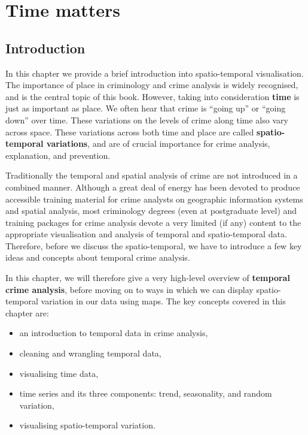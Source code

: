 \documentclass[
]{book}
\providecommand{\tightlist}{%
  \setlength{\itemsep}{0pt}\setlength{\parskip}{0pt}}
\begin{document}
\hypertarget{time-matters}{%
\chapter{Time matters}\label{time-matters}}

\hypertarget{introduction-5}{%
\section{Introduction}\label{introduction-5}}

In this chapter we provide a brief introduction into spatio-temporal visualisation. The importance of place in criminology and crime analysis is widely recognised, and is the central topic of this book. However, taking into consideration \textbf{time} is just as important as place. We often hear that crime is ``going up'' or ``going down'' over time. These variations on the levels of crime along time also vary across space. These variations across both time and place are called \textbf{spatio-temporal variations}, and are of crucial importance for crime analysis, explanation, and prevention.

Traditionally the temporal and spatial analysis of crime are not introduced in a combined manner. Although a great deal of energy has been devoted to produce accessible training material for crime analysts on geographic information systems and spatial analysis, most criminology degrees (even at postgraduate level) and training packages for crime analysis devote a very limited (if any) content to the appropriate visualisation and analysis of temporal and spatio-temporal data. Therefore, before we discuss the spatio-temporal, we have to introduce a few key ideas and concepts about temporal crime analysis.

In this chapter, we will therefore give a very high-level overview of \textbf{temporal crime analysis}, before moving on to ways in which we can display spatio-temporal variation in our data using maps. The key concepts covered in this chapter are:

\begin{itemize}
\tightlist
\item
  an introduction to temporal data in crime analysis,
\item
  cleaning and wrangling temporal data,
\item
  visualising time data,
\item
  time series and its three components: trend, seasonality, and random variation,
\item
  visualising spatio-temporal variation.
\end{itemize}
\end{document}
